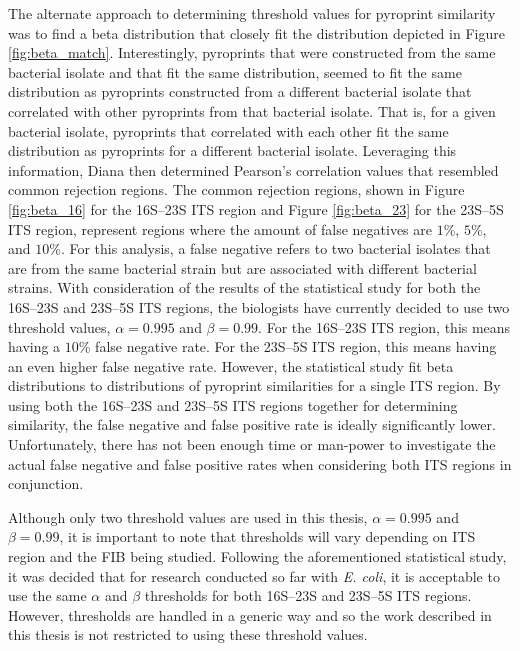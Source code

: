 \documentclass[12pt]{ucthesis}
\begin{document}
      The alternate approach to determining threshold values for pyroprint
      similarity was to find a beta distribution that closely fit the
      distribution depicted in Figure \ref{fig:beta_match}. Interestingly,
      pyroprints that were constructed from the same bacterial isolate and that
      fit the same distribution, seemed to fit the same distribution as
      pyroprints constructed from a different bacterial isolate that correlated
      with other pyroprints from that bacterial isolate. That is, for a given
      bacterial isolate, pyroprints that correlated with each other fit the
      same distribution as pyroprints for a different bacterial isolate.
      Leveraging this information, Diana then determined Pearson's correlation
      values that resembled common rejection regions. The common rejection
      regions, shown in Figure \ref{fig:beta_16} for the 16S--23S ITS region
      and Figure \ref{fig:beta_23} for the 23S--5S ITS region, represent
      regions where the amount of false negatives are $1$\%, $5$\%, and $10$\%.
      For this analysis, a false negative refers to two bacterial isolates that
      are from the same bacterial strain but are associated with different
      bacterial strains. With consideration of the results of the statistical
      study for both the 16S--23S and 23S--5S ITS regions, the biologists have
      currently decided to use two threshold values, $\alpha = 0.995$ and
      $\beta = 0.99$. For the 16S--23S ITS region, this means having a $10$\%
      false negative rate. For the 23S--5S ITS region, this means having an
      even higher false negative rate. However, the statistical study
      fit beta distributions to distributions of pyroprint similarities for a
      single ITS region. By using both the 16S--23S and 23S--5S ITS regions
      together for determining similarity, the false negative and false
      positive rate is ideally significantly lower. Unfortunately, there has
      not been enough time or man-power to investigate the actual false
      negative and false positive rates when considering both ITS regions in
      conjunction.

      Although only two threshold values are used in this thesis, $\alpha =
      0.995$ and $\beta = 0.99$, it is important to note that thresholds will
      vary depending on ITS region and the FIB being studied. Following the
      aforementioned statistical study, it was decided that for research
      conducted so far with \textit{E. coli}, it is acceptable to use the same
      $\alpha$ and $\beta$ thresholds for both 16S--23S and 23S--5S ITS
      regions. However, thresholds are handled in a generic way and so the work
      described in this thesis is not restricted to using these threshold
      values.
\end{document}
